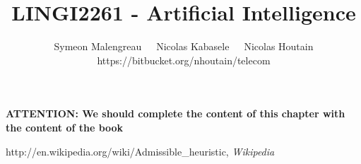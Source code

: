 \documentclass[a4paper, 11pt]{article}
\title{LINGI2261 - Artificial Intelligence}
\date{}
\author{Symeon Malengreau\ \ \ Nicolas Kabasele\ \ \ Nicolas Houtain\\https://bitbucket.org/nhoutain/telecom}
\begin{document}
\maketitle

\textbf{ATTENTION: We should complete the content of this chapter with the content of the book}

\tableofcontents




\begin{thebibliography}{1}
 http://en.wikipedia.org/wiki/Admissible\_heuristic, {\em Wikipedia}
\end{thebibliography}
\end{document}
